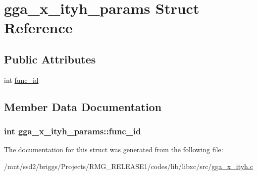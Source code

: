 \hypertarget{structgga__x__ityh__params}{\section{gga\-\_\-x\-\_\-ityh\-\_\-params Struct Reference}
\label{structgga__x__ityh__params}
}
\subsection*{Public Attributes}
\begin{DoxyCompactItemize}
\item 
int \hyperlink{structgga__x__ityh__params_a3ccd17550b2ed85371617eab10196a9f}{func\-\_\-id}
\end{DoxyCompactItemize}


\subsection{Member Data Documentation}
\hypertarget{structgga__x__ityh__params_a3ccd17550b2ed85371617eab10196a9f}{
\subsubsection[{func\-\_\-id}]{\setlength{\rightskip}{0pt plus 5cm}int gga\-\_\-x\-\_\-ityh\-\_\-params\-::func\-\_\-id}}\label{structgga__x__ityh__params_a3ccd17550b2ed85371617eab10196a9f}


The documentation for this struct was generated from the following file\-:\begin{DoxyCompactItemize}
\item 
/mnt/ssd2/briggs/\-Projects/\-R\-M\-G\-\_\-\-R\-E\-L\-E\-A\-S\-E1/codes/lib/libxc/src/\hyperlink{gga__x__ityh_8c}{gga\-\_\-x\-\_\-ityh.\-c}\end{DoxyCompactItemize}
